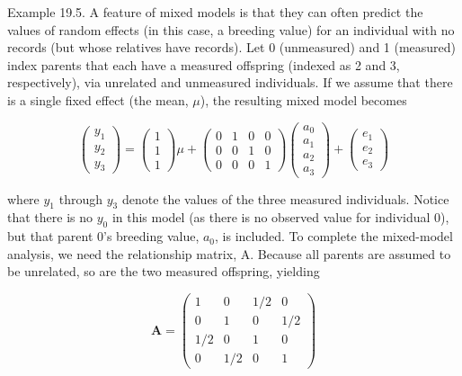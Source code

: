 \documentclass{article}
\begin{document}
Example 19.5. A feature of mixed models is that they can often predict the values of random effects (in this case, a breeding value) for an individual with no records (but whose relatives have records). Let 0 (unmeasured) and 1 (measured) index parents that each have a measured offspring (indexed as 2 and 3, respectively), via unrelated and unmeasured individuals. If we assume that there is a single fixed effect (the mean,  $ \mu $), the resulting mixed model becomes

\begin{equation}
\begin{pmatrix}{{{y_{1}}}} \\{{{y_{2}}}} \\{{{y_{3}}}}\end{pmatrix}=\begin{pmatrix}{{{1}}} \\{{{1}}} \\{{{1}}}\end{pmatrix}\mu+\begin{pmatrix}{{{0}}}&{{{1}}}&{{{0}}}&{{{0}}} \\{{{0}}}&{{{0}}}&{{{1}}}&{{{0}}} \\{{{0}}}&{{{0}}}&{{{0}}}&{{{1}}}\end{pmatrix}\begin{pmatrix}{{{a_{0}}}} \\{{{a_{1}}}} \\{{{a_{2}}}} \\{{{a_{3}}}}\end{pmatrix}+\begin{pmatrix}{{{e_{1}}}} \\{{{e_{2}}}} \\{{{e_{3}}}}\end{pmatrix}
\end{equation}

where  $ y_{1} $ through  $ y_{3} $ denote the values of the three measured individuals. Notice that there is no  $ y_{0} $ in this model (as there is no observed value for individual 0), but that parent 0's breeding value,  $ a_{0} $, is included. To complete the mixed-model analysis, we need the relationship matrix, A. Because all parents are assumed to be unrelated, so are the two measured offspring, yielding

\begin{equation}
\mathbf{A}=\begin{pmatrix}{{{1}}}&{{{0}}}&{{{1/2}}}&{{{0}}} \\{{{0}}}&{{{1}}}&{{{0}}}&{{{1/2}}} \\{{{1/2}}}&{{{0}}}&{{{1}}}&{{{0}}} \\{{{0}}}&{{{1/2}}}&{{{0}}}&{{{1}}}\end{pmatrix}
\end{equation}
\end{document}
